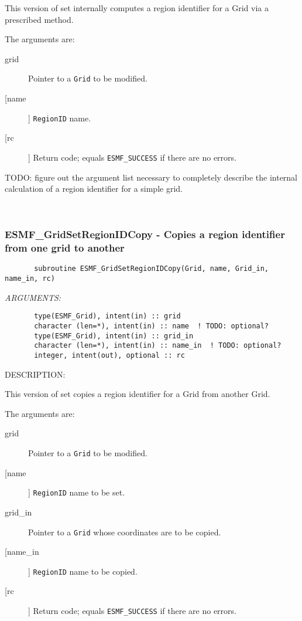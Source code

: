{       This version of set internally computes a region identifier for a
       Grid via a prescribed method.
  
       The arguments are:
       \begin{description}
       \item[grid] 
            Pointer to a {\tt Grid} to be modified.
       \item [[name]]
             {\tt RegionID} name.
       \item[[rc]] 
            Return code; equals {\tt ESMF\_SUCCESS} if there are no errors.
       \end{description}
  
  TODO: figure out the argument list necessary to completely describe the 
        internal calculation of a region identifier for a simple grid. 
 
\mbox{}\hrulefill\ 
 
\subsubsection{ESMF\_GridSetRegionIDCopy - Copies a region identifier from one grid to another}


 
\begin{verbatim}       subroutine ESMF_GridSetRegionIDCopy(Grid, name, Grid_in, name_in, rc)\end{verbatim}{\em ARGUMENTS:}
\begin{verbatim}       type(ESMF_Grid), intent(in) :: grid
       character (len=*), intent(in) :: name  ! TODO: optional?
       type(ESMF_Grid), intent(in) :: grid_in
       character (len=*), intent(in) :: name_in  ! TODO: optional?
       integer, intent(out), optional :: rc            \end{verbatim}
{\sf DESCRIPTION:\\ }


       This version of set copies a region identifier for a Grid from another
       Grid.
  
       The arguments are:
       \begin{description}
       \item[grid] 
            Pointer to a {\tt Grid} to be modified.
       \item [[name]]
             {\tt RegionID} name to be set.
       \item[grid\_in] 
            Pointer to a {\tt Grid} whose coordinates are to be copied.
       \item [[name\_in]]
             {\tt RegionID} name to be copied.
       \item[[rc]] 
            Return code; equals {\tt ESMF\_SUCCESS} if there are no errors.
       \end{description}
   
}
